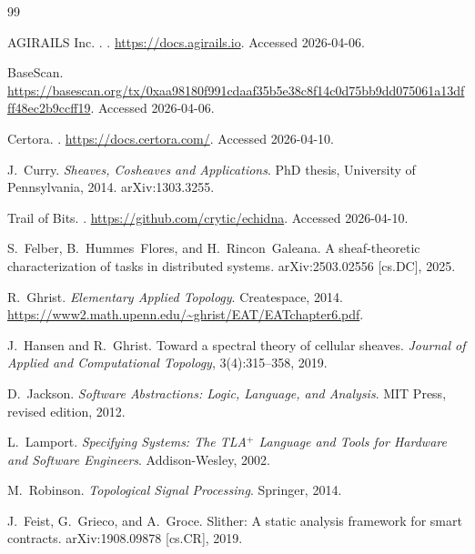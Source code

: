 \documentclass[11pt]{article}
\theoremstyle{plain}
\theoremstyle{definition}
\begin{document}
\begin{thebibliography}{99}

AGIRAILS Inc.
.
.
\newblock \url{https://docs.agirails.io}.
\newblock Accessed 2026-04-06.

BaseScan.
\newblock \url{https://basescan.org/tx/0xaa98180f991cdaaf35b5e38c8f14c0d75bb9dd075061a13dfff48ec2b9ccff19}.
\newblock Accessed 2026-04-06.

Certora.
.
\newblock \url{https://docs.certora.com/}.
\newblock Accessed 2026-04-10.

J.~Curry.
\newblock \emph{Sheaves, Cosheaves and Applications}.
\newblock PhD thesis, University of Pennsylvania, 2014.
\newblock arXiv:1303.3255.

Trail of Bits.
.
\newblock \url{https://github.com/crytic/echidna}.
\newblock Accessed 2026-04-10.

S.~Felber, B.~Hummes~Flores, and H.~Rincon~Galeana.
\newblock A sheaf-theoretic characterization of tasks in distributed systems.
\newblock arXiv:2503.02556 [cs.DC], 2025.

R.~Ghrist.
\newblock \emph{Elementary Applied Topology}.
\newblock Createspace, 2014.
\newblock \url{https://www2.math.upenn.edu/~ghrist/EAT/EATchapter6.pdf}.

J.~Hansen and R.~Ghrist.
\newblock Toward a spectral theory of cellular sheaves.
\newblock \emph{Journal of Applied and Computational Topology}, 3(4):315--358,
  2019.

D.~Jackson.
\newblock \emph{Software Abstractions: Logic, Language, and Analysis}.
\newblock MIT Press, revised edition, 2012.

L.~Lamport.
\newblock \emph{Specifying Systems: The TLA$^+$ Language and Tools for Hardware
  and Software Engineers}.
\newblock Addison-Wesley, 2002.

M.~Robinson.
\newblock \emph{Topological Signal Processing}.
\newblock Springer, 2014.

J.~Feist, G.~Grieco, and A.~Groce.
\newblock Slither: A static analysis framework for smart contracts.
\newblock arXiv:1908.09878 [cs.CR], 2019.

\end{thebibliography}
\end{document}
